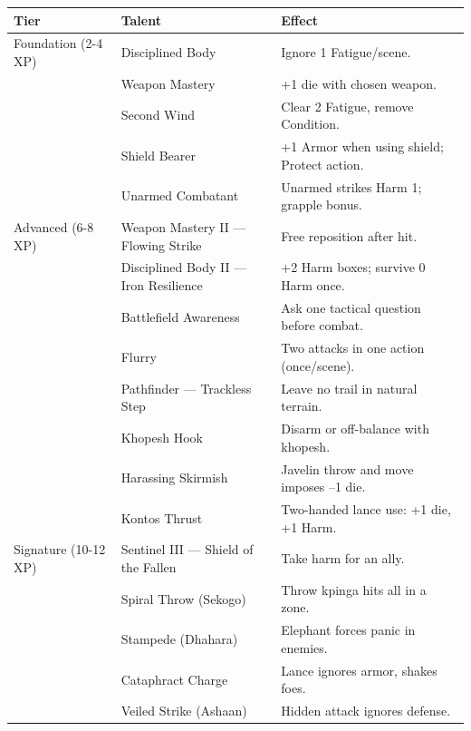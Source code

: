 \documentclass[9pt,a5paper]{extbook}
\begin{document}
{\small
\begin{longtable}{@{}p{2.5cm} p{4.5cm} p{5cm}@{}}
\toprule
\textbf{Tier} & \textbf{Talent} & \textbf{Effect} \\
\midrule
Foundation (2-4 XP) & Disciplined Body & Ignore 1 Fatigue/scene. \\
& Weapon Mastery & +1 die with chosen weapon. \\
& Second Wind & Clear 2 Fatigue, remove Condition. \\
& Shield Bearer & +1 Armor when using shield; Protect action. \\
& Unarmed Combatant & Unarmed strikes Harm 1; grapple bonus. \\
\midrule
Advanced (6-8 XP) & Weapon Mastery II --- Flowing Strike & Free reposition after hit. \\
& Disciplined Body II --- Iron Resilience & +2 Harm boxes; survive 0 Harm once. \\
& Battlefield Awareness & Ask one tactical question before combat. \\
& Flurry & Two attacks in one action (once/scene). \\
& Pathfinder --- Trackless Step & Leave no trail in natural terrain. \\
& Khopesh Hook & Disarm or off-balance with khopesh. \\
& Harassing Skirmish & Javelin throw and move imposes --1 die. \\
& Kontos Thrust & Two-handed lance use: +1 die, +1 Harm. \\
\midrule
Signature (10-12 XP) & Sentinel III --- Shield of the Fallen & Take harm for an ally. \\
& Spiral Throw (Sekogo) & Throw kpinga hits all in a zone. \\
& Stampede (Dhahara) & Elephant forces panic in enemies. \\
& Cataphract Charge & Lance ignores armor, shakes foes. \\
& Veiled Strike (Ashaan) & Hidden attack ignores defense. \\
\bottomrule
\end{longtable}
}

\clearpage
\end{document}
